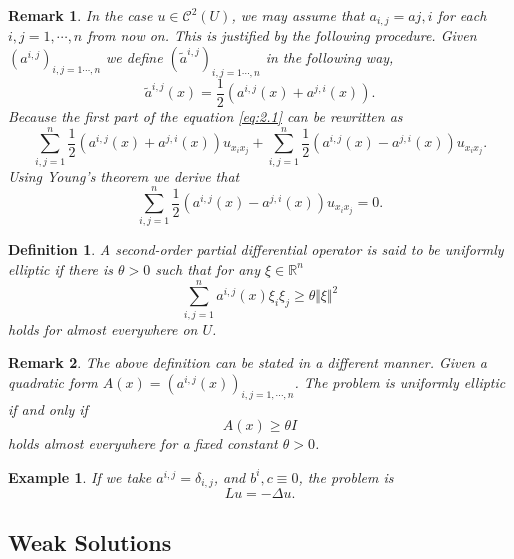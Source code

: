 \documentclass{article}
\newtheorem{definition}{Definition}[section]
\newtheorem{remark}{Remark}[section]
\newtheorem{example}{Example}[section]
\numberwithin{equation}{section}
\begin{document}
\begin{remark}
In the case $u\in\mathcal{C}^2(U)$, we may assume that $a_{i,j}=a{j,i}$ for each $i,j=1,\cdots,n$ from now on. This is justified by the following procedure.
Given $(a^{i,j})_{i,j=1\cdots,n}$ we define $(\tilde{a}^{i,j})_{i,j=1\cdots,n}$ in the following way,
\begin{equation*}
\tilde{a}^{i,j}(x) = {\frac 1 2}(a^{i,j}(x)+a^{j,i}(x)).
\end{equation*}
Because the first part of the equation \ref{eq:2.1} can be rewritten as
\begin{equation*}
\sum_{i,j=1}^n {\frac 1 2}(a^{i,j}(x)+a^{j,i}(x))u_{x_ix_j}+\sum_{i,j=1}^n{\frac 1 2}(a^{i,j}(x)-a^{j,i}(x))u_{x_ix_j}.
\end{equation*}
Using Young's theorem we derive that
\begin{equation*}
\sum_{i,j=1}^n{\frac 1 2}(a^{i,j}(x)-a^{j,i}(x))u_{x_ix_j} = 0.
\end{equation*}
\end{remark}

\begin{definition}
A second-order partial differential operator is said to be uniformly elliptic if there is $\theta>0$ such that for any $\xi\in\mathbb{R}^n$
\begin{equation*}
\sum_{i,j=1}^n a^{i,j}(x)\xi_i\xi_j \geq \theta\Vert \xi\Vert^2 
\end{equation*}
holds for almost everywhere on $U$.
\end{definition}

\begin{remark}
The above definition can be stated in a different manner. Given a quadratic form $A(x) = (a^{i,j}(x))_{i,j=1,\cdots,n}$. The problem is uniformly elliptic if and only if 
\begin{equation*}
A(x)\geq \theta I
\end{equation*}
holds almost everywhere for a fixed constant $\theta>0$.
\end{remark}

\begin{example}
If we take $a^{i,j}=\delta_{i,j}$, and $b^i,c\equiv 0$, the problem is 
\begin{equation*}
Lu = -\Delta u.
\end{equation*}
\end{example}

\subsection{Weak Solutions}
\end{document}
